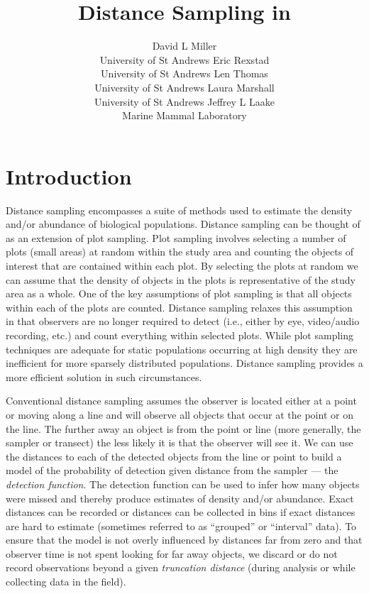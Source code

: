 \documentclass[article]{jss}\usepackage[]{graphicx}\usepackage[]{color}
\author{David L Miller\\University of St Andrews \AND
        Eric Rexstad\\University of St Andrews \And
        Len Thomas\\University of St Andrews \AND
        Laura Marshall\\University of St Andrews \And
        Jeffrey L Laake\\Marine Mammal Laboratory}
\title{Distance Sampling in \proglang{R}}
\begin{document}
\section{Introduction}


Distance sampling \citep{Buckland:2001vm, Buckland:2004ts, buckland2015distance} encompasses a suite of methods used to estimate the density and/or abundance of biological populations. Distance sampling can be thought of as an extension of plot sampling. Plot sampling involves selecting a number of plots (small areas) at random within the study area and counting the objects of interest that are contained within each plot. By selecting the plots at random we can assume that the density of objects in the plots is representative of the study area as a whole. One of the key assumptions of plot sampling is that all objects within each of the plots are counted. Distance sampling relaxes this assumption in that observers are no longer required to detect (i.e., either by eye, video/audio recording, etc.) and count everything within selected plots. While plot sampling techniques are adequate for static populations occurring at high density they are inefficient for more sparsely distributed populations. Distance sampling provides a more efficient solution in such circumstances.

Conventional distance sampling assumes the observer is located either at a point or moving along a line and will observe all objects that occur at the point or on the line. The further away an object is from the point or line (more generally, the sampler or transect) the less likely it is that the observer will see it. We can use the distances to each of the detected objects from the line or point to build a model of the probability of detection given distance from the sampler --- the \textit{detection function}. The detection function can be used to infer how many objects were missed and thereby produce estimates of density and/or abundance. Exact distances can be recorded or distances can be collected in bins if exact distances are hard to estimate (sometimes referred to as ``grouped'' or ``interval'' data). To ensure that the model is not overly influenced by distances far from zero and that observer time is not spent looking for far away objects, we discard or do not record observations beyond a given \textit{truncation distance} (during analysis or while collecting data in the field).
\end{document}
